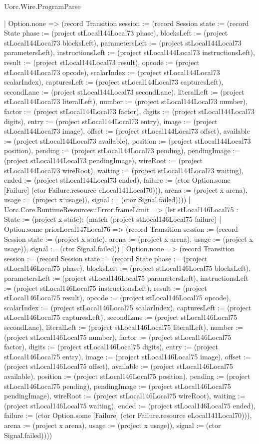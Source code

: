 \begin{lexlean}{Uorc.Wire.ProgramParse}
\begin{semanticmodule}
{        | Option.none => (record Transition {session := (record Session {state := (record State {phase := (project stLocal144Local73 phase), blocksLeft := (project stLocal144Local73 blocksLeft), parametersLeft := (project stLocal144Local73 parametersLeft), instructionsLeft := (project stLocal144Local73 instructionsLeft), result := (project stLocal144Local73 result), opcode := (project stLocal144Local73 opcode), scalarIndex := (project stLocal144Local73 scalarIndex), capturesLeft := (project stLocal144Local73 capturesLeft), secondLane := (project stLocal144Local73 secondLane), literalLeft := (project stLocal144Local73 literalLeft), number := (project stLocal144Local73 number), factor := (project stLocal144Local73 factor), digits := (project stLocal144Local73 digits), entry := (project stLocal144Local73 entry), image := (project stLocal144Local73 image), offset := (project stLocal144Local73 offset), available := (project stLocal144Local73 available), position := (project stLocal144Local73 position), pending := (project stLocal144Local73 pending), pendingImage := (project stLocal144Local73 pendingImage), wireRoot := (project stLocal144Local73 wireRoot), waiting := (project stLocal144Local73 waiting), ended := (project stLocal144Local73 ended), failure := (ctor Option.some [Failure] (ctor Failure.resource eLocal141Local70))}), arena := (project x arena), usage := (project x usage)}), signal := (ctor Signal.failed)})))
      | Uorc.Core.RuntimeResources::Error.frameLimit => (let stLocal146Local75 : State := (project x state); (match (project stLocal146Local75 failure)
        | Option.some priorLocal147Local76 => (record Transition {session := (record Session {state := (project x state), arena := (project x arena), usage := (project x usage)}), signal := (ctor Signal.failed)})
        | Option.none => (record Transition {session := (record Session {state := (record State {phase := (project stLocal146Local75 phase), blocksLeft := (project stLocal146Local75 blocksLeft), parametersLeft := (project stLocal146Local75 parametersLeft), instructionsLeft := (project stLocal146Local75 instructionsLeft), result := (project stLocal146Local75 result), opcode := (project stLocal146Local75 opcode), scalarIndex := (project stLocal146Local75 scalarIndex), capturesLeft := (project stLocal146Local75 capturesLeft), secondLane := (project stLocal146Local75 secondLane), literalLeft := (project stLocal146Local75 literalLeft), number := (project stLocal146Local75 number), factor := (project stLocal146Local75 factor), digits := (project stLocal146Local75 digits), entry := (project stLocal146Local75 entry), image := (project stLocal146Local75 image), offset := (project stLocal146Local75 offset), available := (project stLocal146Local75 available), position := (project stLocal146Local75 position), pending := (project stLocal146Local75 pending), pendingImage := (project stLocal146Local75 pendingImage), wireRoot := (project stLocal146Local75 wireRoot), waiting := (project stLocal146Local75 waiting), ended := (project stLocal146Local75 ended), failure := (ctor Option.some [Failure] (ctor Failure.resource eLocal141Local70))}), arena := (project x arena), usage := (project x usage)}), signal := (ctor Signal.failed)})))
}
\end{semanticmodule}
\end{lexlean}

